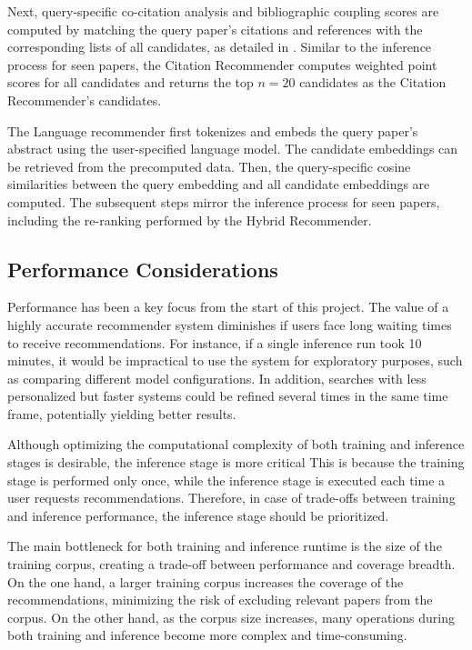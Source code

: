 Next, query-specific co-citation analysis and bibliographic coupling scores are computed by matching the query paper's citations and references with the corresponding lists of all candidates, as detailed in .
Similar to the inference process for seen papers, the Citation Recommender computes weighted point scores for all candidates and returns the top $n=20$ candidates as the Citation Recommender's candidates.

The Language recommender first tokenizes and embeds the query paper's abstract using the user-specified language model. The candidate embeddings can be retrieved from the precomputed data. Then, the query-specific cosine similarities between the query embedding and all candidate embeddings are computed. The subsequent steps mirror the inference process for seen papers, including the re-ranking performed by the Hybrid Recommender.


\subsection{Performance Considerations} \label{sec:performance-considerations}

Performance has been a key focus from the start of this project.
The value of a highly accurate recommender system diminishes if users face long waiting times to receive recommendations.
For instance, if a single inference run took 10 minutes, it would be impractical to use the system for exploratory purposes, such as comparing different model configurations.
In addition, searches with less personalized but faster systems could be refined several times in the same time frame, potentially yielding better results.

Although optimizing the computational complexity of both training and inference stages is desirable, the inference stage is more critical
This is because the training stage is performed only once, while the inference stage is executed each time a user requests recommendations. Therefore, in case of trade-offs between training and inference performance, the inference stage should be prioritized.

The main bottleneck for both training and inference runtime is the size of the training corpus, creating a trade-off between performance and coverage breadth.
On the one hand, a larger training corpus increases the coverage of the recommendations, minimizing the risk of excluding relevant papers from the corpus. On the other hand, as the corpus size increases, many operations during both training and inference become more complex and time-consuming.


